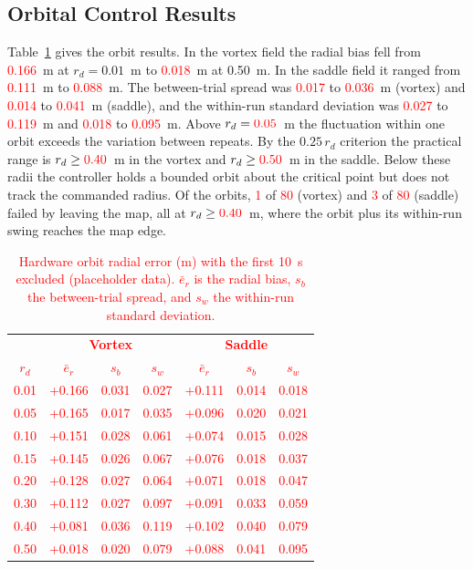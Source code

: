 \documentclass[lettersize,journal]{IEEEtran}
\newcommand{\syn}[1]{\textcolor{red}{#1}}            %
\begin{document}
\subsection{Orbital Control Results}

Table~\ref{tab:orbital_radius_comparison} gives the orbit results. In the vortex field the radial bias fell from \syn{0.166}~m at $r_d = 0.01$~m to \syn{0.018}~m at 0.50~m. In the saddle field it ranged from \syn{0.111}~m to \syn{0.088}~m. The between-trial spread was \syn{0.017} to \syn{0.036}~m (vortex) and \syn{0.014} to \syn{0.041}~m (saddle), and the within-run standard deviation was \syn{0.027} to \syn{0.119}~m and \syn{0.018} to \syn{0.095}~m. Above $r_d = \syn{0.05}$~m the fluctuation within one orbit exceeds the variation between repeats. By the $0.25\,r_d$ criterion the practical range is $r_d \ge \syn{0.40}$~m in the vortex and $r_d \ge \syn{0.50}$~m in the saddle. Below these radii the controller holds a bounded orbit about the critical point but does not track the commanded radius. Of the orbits, \syn{1} of \syn{80} (vortex) and \syn{3} of \syn{80} (saddle) failed by leaving the map, all at $r_d \ge \syn{0.40}$~m, where the orbit plus its within-run swing reaches the map edge. %

\begin{table}[!t]
\centering
\footnotesize
\caption{Hardware orbit radial error (m) with the first 10~s excluded \syn{(placeholder data)}. $\bar e_r$ is the radial bias, $s_b$ the between-trial spread, and $s_w$ the within-run standard deviation.}
\label{tab:orbital_radius_comparison}
\setlength{\tabcolsep}{4pt}
\syn{\begin{tabular}{c|ccc|ccc}
\hline
 & \multicolumn{3}{c|}{\textbf{Vortex}} & \multicolumn{3}{c}{\textbf{Saddle}} \\
$r_d$ & $\bar e_r$ & $s_b$ & $s_w$ & $\bar e_r$ & $s_b$ & $s_w$ \\
\hline
0.01 & +0.166 & 0.031 & 0.027 & +0.111 & 0.014 & 0.018 \\
0.05 & +0.165 & 0.017 & 0.035 & +0.096 & 0.020 & 0.021 \\
0.10 & +0.151 & 0.028 & 0.061 & +0.074 & 0.015 & 0.028 \\
0.15 & +0.145 & 0.026 & 0.067 & +0.076 & 0.018 & 0.037 \\
0.20 & +0.128 & 0.027 & 0.064 & +0.071 & 0.018 & 0.047 \\
0.30 & +0.112 & 0.027 & 0.097 & +0.091 & 0.033 & 0.059 \\
0.40 & +0.081 & 0.036 & 0.119 & +0.102 & 0.040 & 0.079 \\
0.50 & +0.018 & 0.020 & 0.079 & +0.088 & 0.041 & 0.095 \\
\hline
\end{tabular}} %
\end{table}
\end{document}
